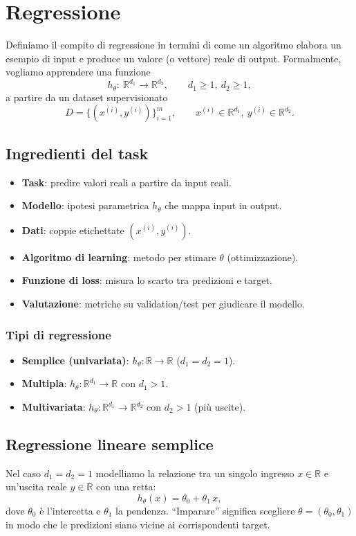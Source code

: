 \chapter{Regressione}
Definiamo il compito di regressione in termini di come un algoritmo elabora un esempio
di input e produce un valore (o vettore) reale di output. Formalmente, vogliamo
apprendere una funzione
\[
h_\theta:\ \mathbb{R}^{d_1}\rightarrow \mathbb{R}^{d_2},\qquad d_1\ge 1,\ d_2\ge 1,
\]
a partire da un dataset supervisionato
\[
D=\{(x^{(i)},y^{(i)})\}_{i=1}^m,\qquad x^{(i)}\in\mathbb{R}^{d_1},\ y^{(i)}\in\mathbb{R}^{d_2}.
\]

\section{Ingredienti del task}
\begin{itemize}
  \item \textbf{Task}: predire valori reali a partire da input reali.
  \item \textbf{Modello}: ipotesi parametrica \(h_\theta\) che mappa input in output.
  \item \textbf{Dati}: coppie etichettate \((x^{(i)},y^{(i)})\).
  \item \textbf{Algoritmo di learning}: metodo per stimare \(\theta\) (ottimizzazione).
  \item \textbf{Funzione di loss}: misura lo scarto tra predizioni e target.
  \item \textbf{Valutazione}: metriche su validation/test per giudicare il modello.
\end{itemize}

\subsection{Tipi di regressione}
\begin{itemize}
  \item \textbf{Semplice (univariata)}: \(h_\theta:\mathbb{R}\to\mathbb{R}\) (\(d_1=d_2=1\)).
  \item \textbf{Multipla}: \(h_\theta:\mathbb{R}^{d_1}\to\mathbb{R}\) con \(d_1>1\).
  \item \textbf{Multivariata}: \(h_\theta:\mathbb{R}^{d_1}\to\mathbb{R}^{d_2}\) con \(d_2>1\) (più uscite).
\end{itemize}

\section{Regressione lineare semplice}
Nel caso \(d_1=d_2=1\) modelliamo la relazione tra un singolo ingresso \(x\in\mathbb{R}\) e
un'uscita reale \(y\in\mathbb{R}\) con una retta:
\[
h_\theta(x)=\theta_0+\theta_1\,x,
\]
dove \(\theta_0\) è l'intercetta e \(\theta_1\) la pendenza. ``Imparare'' significa scegliere
\(\theta=(\theta_0,\theta_1)\) in modo che le predizioni siano vicine ai corrispondenti target.

